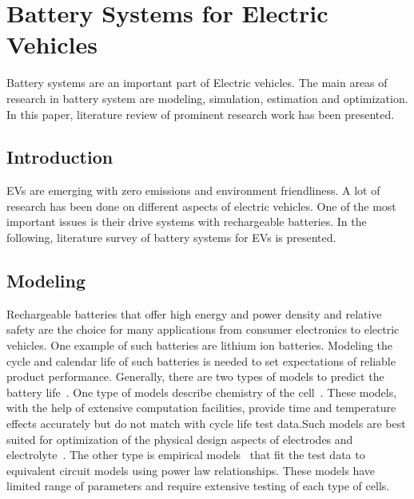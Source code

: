 \section{Battery Systems for Electric Vehicles} \label{sec:battery}

Battery systems are an important part of Electric vehicles.  The main areas of research in battery system are modeling, simulation, estimation and optimization. In this paper, literature review of prominent research work has been presented.


\subsection{Introduction}

EVs are emerging with zero emissions and environment friendliness. A lot of research has been done on different aspects of electric vehicles. One of the most important issues is their drive systems with rechargeable batteries. In the following, literature survey of battery systems for EVs is presented. 

\subsection{Modeling}

Rechargeable batteries that offer high energy and
power density and relative safety are the choice for many applications from consumer
electronics to electric vehicles. One example of such batteries are lithium ion batteries. Modeling the cycle and
calendar life of such batteries is needed to set
expectations of reliable product performance. Generally, there are two types of models to predict the battery life~\cite{ZS_millner}. One type of models describe chemistry of the cell~\cite{ZS_Ning}. These models, with the help of extensive computation facilities, provide time and temperature effects accurately but do not match with cycle life test data.Such models are best suited for
optimization of the physical design aspects of electrodes
and electrolyte~\cite{ZS_den}. The other type is empirical models~\cite{ZS_dubarry} that fit the test data to equivalent circuit models using power law relationships. These models have limited range of parameters and require extensive testing of each type of cells. 

